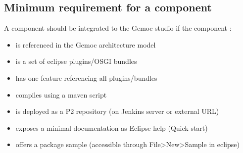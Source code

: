 \documentclass{gemoc} %
\begin{document}
\subsection{Minimum requirement for a component}
A component should be integrated to the Gemoc studio if the component : 
\newline
\begin{itemize}
	\item is referenced in the Gemoc architecture model
	\item is a set of eclipse plugins/OSGI bundles
	\item has one feature referencing all plugins/bundles
	\item compiles using a maven script
	\item is deployed as a P2 repository (on Jenkins server or external URL)
	\item exposes a minimal documentation as Eclipse help (Quick start)
	\item offers a package sample (accessible through File>New>Sample in eclipse)
\end{itemize}

\end{document}
